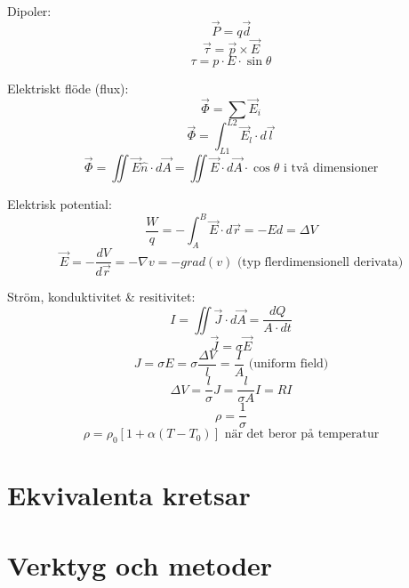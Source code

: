 \documentclass{article}
\begin{document}
Dipoler:
\[ \vec{P} = q \vec{d} \]
\[ \vec{\tau} = \vec{p} \times \vec{E} \]
\[ \tau = p \cdot E \cdot \sin{\theta} \]

Elektriskt flöde (flux):
\[ \vec{\Phi} = \sum \vec{E}_i \]
\[ \vec{\Phi} = \int_{L1}^{L2} \vec{E}_l \cdot d\vec{l} \]
\[ \vec{\Phi} = \iint \vec{E}\hat{n} \cdot d\vec{A} = \iint \vec{E} \cdot d\vec{A} \cdot \cos{\theta} \textrm{ i två dimensioner}\]

Elektrisk potential:
\[ \frac{W}{q} = -\int_A^B \vec{E} \cdot d\vec{r} = -Ed = \Delta V \]
\[ \vec{E} = -\frac{dV}{d\vec{r}} = -\nabla v  = -grad(v) \textrm{ (typ flerdimensionell derivata)} \]

Ström, konduktivitet \& resitivitet:
\[ I = \iint \vec{J} \cdot d\vec{A} = \frac{dQ}{A \cdot dt} \]
\[ \vec{J} = \sigma \vec{E} \]
\[ J = \sigma E = \sigma \frac{\Delta V}{l} = \frac{I}{A} \textrm{ (uniform field)} \]
\[ \Delta V = \frac{l}{\sigma}J = \frac{l}{\sigma A} I = RI \]
\[ \rho = \frac{1}{\sigma} \]
\[ \rho = \rho_0 [1 + \alpha (T - T_0)] \textrm{ när det beror på temperatur} \]


\section{Ekvivalenta kretsar}


\section{Verktyg och metoder}

\end{document}
